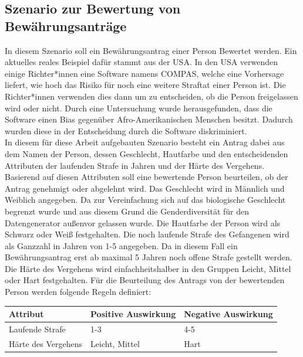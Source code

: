 \begin{onehalfspace}
\subsection{Szenario zur Bewertung von Bewährungsanträge}
\label{subsubsec:szenario1}
In diesem Szenario soll ein Bewährungsantrag einer Person Bewertet werden. Ein aktuelles reales Beispiel dafür stammt aus der USA. In den USA verwenden einige Richter*innen eine Software namens \glqq{}COMPAS\grqq{}, welche eine Vorhersage liefert, wie hoch das Risiko für noch eine weitere Straftat einer Person ist. Die Richter*innen verwenden dies dann um zu entscheiden, ob die Person freigelassen wird oder nicht. Durch eine Untersuchung wurde herausgefunden, dass die Software einen Bias gegenüber Afro-Amerikanischen Menschen besitzt. Dadurch wurden diese in der Entscheidung durch die Software diskriminiert. \cite{Mehrabi2021}\cite{MachineBias2016}\\ 
In diesem für diese Arbeit aufgebauten Szenario besteht ein Antrag dabei aus dem Namen der Person, dessen Geschlecht, Hautfarbe und den entscheidenden Attributen der laufenden Strafe in Jahren und der Härte des Vergehens. Basierend auf diesen Attributen soll eine bewertende Person beurteilen, ob der Antrag genehmigt oder abgelehnt wird. Das Geschlecht wird in \glqq{}Männlich\grqq{} und \glqq{}Weiblich\grqq{} angegeben. Da zur Vereinfachung sich auf das biologische Geschlecht begrenzt wurde und aus diesem Grund die Genderdiversität für den Datengenerator au{\ss}envor gelassen wurde. Die Hautfarbe der Person wird als \glqq{}Schwarz\grqq{} oder \glqq{}Weiß\grqq{} festgehalten. Die noch laufende Strafe des Gefangenen wird als Ganzzahl in Jahren von 1-5 angegeben. Da in diesem Fall ein Bewährungsantrag erst ab maximal 5 Jahren noch offene Strafe gestellt werden. Die Härte des Vergehens wird einfachheitshalber in den Gruppen \glqq{}Leicht\grqq{}, \glqq{}Mittel\grqq{} oder \glqq{}Hart\grqq{} festgehalten. \newline
Für die Beurteilung des Antrags von der bewertenden Person werden folgende Regeln definiert:
\begin{table}[!h]
    \centering
    \begin{tabular}{|l|l|l|}
    \hline
    \textbf{Attribut}   & \textbf{Positive Auswirkung} & \textbf{Negative Auswirkung} \\ \hline
    Laufende Strafe     & 1-3                          & 4-5                          \\ \hline
    Härte des Vergehens & Leicht, Mittel               & Hart                         \\ \hline

\end{tabular}
\end{table}
\end{onehalfspace}
